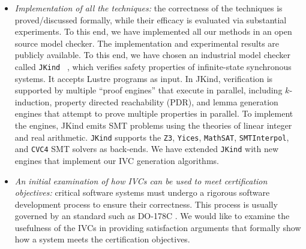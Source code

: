 \begin{itemize}
\item \emph{Implementation of all the techniques:} the correctness of the techniques is proved/discussed formally, while their efficacy is evaluated via substantial experiments. To this end, we have implemented all our methods in an open source model checker. The implementation and experimental results are publicly available. To this  end, we have chosen an industrial model checker called \texttt{JKind} ~\cite{jkind},
which verifies safety properties of infinite-state synchronous systems.
It accepts Lustre programs \cite{Halbwachs91:lustre} as input. In JKind, verification is supported by multiple ``proof engines'' that execute in parallel, including $k$-induction,
property directed reachability (PDR), and lemma generation engines that attempt to prove
multiple properties in parallel. To implement the engines,
JKind emits SMT problems using the theories of linear integer and real arithmetic. \texttt{JKind} supports the \texttt{Z3}, \texttt{Yices}, \texttt{MathSAT}, \texttt{SMTInterpol}, and \texttt{CVC4} SMT solvers as back-ends.  We have extended \texttt{JKind} with new engines that implement our IVC generation algorithms.
\item \emph{An initial examination of how IVCs can be used to meet certification objectives:}  critical software systems must undergo a rigorous software development process to ensure their correctness. This process is usually governed by an standard such as DO-178C \cite{DO178C}. We would like to examine the usefulness of the IVCs in providing satisfaction arguments that formally show how a system meets the certification objectives.

\end{itemize}

